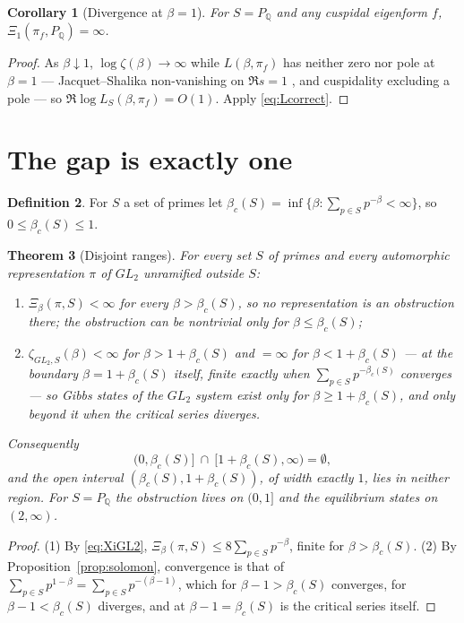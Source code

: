 \documentclass[11pt]{amsart}
\numberwithin{equation}{section}
\newtheorem{theorem}{Theorem}[section]
\newtheorem{corollary}[theorem]{Corollary}
\theoremstyle{definition}
\newtheorem{definition}[theorem]{Definition}
\theoremstyle{remark}
\newcommand{\Q}{\mathbb{Q}}
\begin{document}
\begin{corollary}[Divergence at $\beta=1$]\label{cor:diverge}
For $S=P_\Q$ and any cuspidal eigenform $f$, $\Xi_1(\pi_f,P_\Q)=\infty$.
\end{corollary}

\begin{proof}
As $\beta\downarrow1$, $\log\zeta(\beta)\to\infty$ while $L(\beta,\pi_f)$ has neither zero nor
pole at $\beta=1$ --- Jacquet--Shalika non-vanishing on $\Re s=1$ \cite{JS}, and cuspidality excluding a
pole --- so $\Re\log L_S(\beta,\pi_f)=O(1)$. Apply \eqref{eq:Lcorrect}.
\end{proof}

\section{The gap is exactly one}

\begin{definition}\label{def:betac}
For $S$ a set of primes let $\beta_c(S)=\inf\{\beta:\sum_{p\in S}p^{-\beta}<\infty\}$, so
$0\le\beta_c(S)\le1$.
\end{definition}

\begin{theorem}[Disjoint ranges]\label{thm:gap}
For every set $S$ of primes and every automorphic representation $\pi$ of $GL_2$ unramified
outside $S$:
\begin{enumerate}
\item $\Xi_\beta(\pi,S)<\infty$ for every $\beta>\beta_c(S)$, so no representation is an
obstruction there; the obstruction can be nontrivial only for $\beta\le\beta_c(S)$;
\item $\zeta_{GL_2,S}(\beta)<\infty$ for $\beta>1+\beta_c(S)$ and $=\infty$ for
$\beta<1+\beta_c(S)$ --- at the boundary $\beta=1+\beta_c(S)$ itself, finite exactly when
$\sum_{p\in S}p^{-\beta_c(S)}$ converges --- so Gibbs states of
the $GL_2$ system exist only for $\beta\ge1+\beta_c(S)$, and only beyond it when the
critical series diverges.
\end{enumerate}
Consequently
\[
\bigl(0,\beta_c(S)\bigr]\ \cap\ \bigl[1+\beta_c(S),\infty\bigr)=\emptyset ,
\]
and the open interval $(\beta_c(S),1+\beta_c(S))$, of width exactly $1$, lies in neither
region. For $S=P_\Q$ the obstruction lives
on $(0,1]$ and the equilibrium states on $(2,\infty)$.
\end{theorem}

\begin{proof}
(1) By \eqref{eq:XiGL2}, $\Xi_\beta(\pi,S)\le8\sum_{p\in S}p^{-\beta}$, finite for
$\beta>\beta_c(S)$. (2) By Proposition~\ref{prop:solomon}, convergence is that of
$\sum_{p\in S}p^{1-\beta}=\sum_{p\in S}p^{-(\beta-1)}$, which for $\beta-1>\beta_c(S)$
converges, for $\beta-1<\beta_c(S)$ diverges, and at $\beta-1=\beta_c(S)$ is the critical
series itself.
\end{proof}
\end{document}
